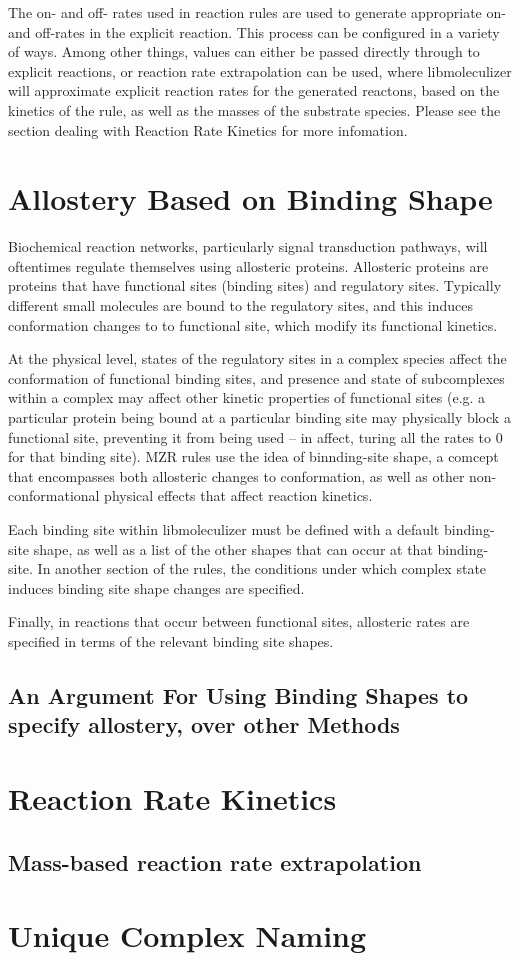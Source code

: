 The on- and off- rates used in reaction rules are used to generate
appropriate on- and off-rates in the explicit reaction.  This process
can be configured in a variety of ways.  Among other things, values
can either be passed directly through to explicit reactions, or
reaction rate extrapolation can be used, where libmoleculizer will
approximate explicit reaction rates for the generated reactons, based
on the kinetics of the rule, as well as the masses of the substrate
species.  Please see the section dealing with Reaction Rate Kinetics
for more infomation.  

\section{Allostery Based on Binding Shape}

Biochemical reaction networks, particularly signal transduction
pathways, will oftentimes regulate themselves using allosteric
proteins.  Allosteric proteins are proteins that have functional sites
(binding sites) and regulatory sites.  Typically different small
molecules are bound to the regulatory sites, and this induces
conformation changes to to functional site, which modify its
functional kinetics.  

At the physical level, states of the regulatory sites in a complex
species affect the conformation of functional binding sites, and
presence and state of subcomplexes within a complex may affect other
kinetic properties of functional sites (e.g. a particular protein
being bound at a particular binding site may physically block a
functional site, preventing it from being used -- in affect, turing
all the rates to 0 for that binding site).  MZR rules use the idea of
binnding-site shape, a comcept that encompasses both allosteric
changes to conformation, as well as other non-conformational physical
effects that affect reaction kinetics.  

Each binding site within libmoleculizer must be defined with a default
binding-site shape, as well as a list of the other shapes that can
occur at that binding-site. In another section of the rules,
the conditions under which complex state induces binding site shape
changes are specified.

Finally, in reactions that occur between functional sites, allosteric
rates are specified in terms of the relevant binding site shapes.  

\subsection{An Argument For Using Binding Shapes to specify allostery,
  over other Methods}




\section{Reaction Rate Kinetics}



\subsection{Mass-based reaction rate extrapolation}



\section{Unique Complex Naming}